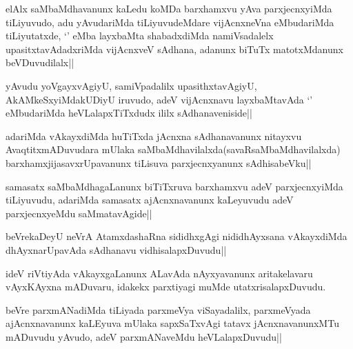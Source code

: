 
\begin{artha}
elAlx saMbaMdhavanunx kaLedu koMDa barxhamxvu yAva parxjecnxyiMda tiLiyuvudo, adu yAvudariMda tiLiyuvudeMdare vijAcnxneVna eMbudariMda tiLiyutatxde, `\stext' eMba layxbaMta shabadxdiMda namiVsadalelx upasitxtavAdadxriMda vijAcnxveV sAdhana, adanunx biTuTx matotxMdanunx beVDuvudilalx||
\end{artha}

\begin{artha}
yAvudu yoVgayxvAgiyU, samiVpadalilx upasithxtavAgiyU, AkAMkeSxyiMdakUDiyU iruvudo, adeV vijAcnxnavu layxbaMtavAda `\stext' eMbudariMda heVLalapxTiTxdudx ililx sAdhanaveniside||
\end{artha}

\begin{artha}
adariMda vAkayxdiMda huTiTxda jAcnxna sAdhanavanunx nitayxvu AvaqtitxmADuvudara mUlaka saMbaMdhavilalxda(savaRsaMbaMdhavilalxda) barxhamxjijasavxrUpavanunx tiLisuva parxjecnxyanunx sAdhisabeVku||
\end{artha}

\begin{artha}
samasatx saMbaMdhagaLanunx biTiTxruva barxhamxvu adeV parxjecnxyiMda tiLiyuvudu, adariMda samasatx ajAcnxnavanunx kaLeyuvudu adeV parxjecnxyeMdu saMmatavAgide||
\end{artha}


\begin{artha}
beVrekaDeyU neVrA AtamxdashaRna sididhxgAgi nididhAyxsana vAkayxdiMda dhAyxnarUpavAda sAdhanavu vidhisalapxDuvudu||
\end{artha}

\begin{artha}
ideV riVtiyAda vAkayxgaLanunx ALavAda nAyxyavanunx aritakelavaru vAyxKAyxna mADuvaru, idakekx parxtiyagi muMde utatxrisalapxDuvudu.
\end{artha}


\begin{artha}
beVre parxmANadiMda tiLiyada parxmeVya viSayadalilx, parxmeVyada ajAcnxnavanunx kaLEyuva mUlaka sapxSaTxvAgi tatavx jAcnxnavanunxMTu mADuvudu yAvudo, adeV parxmANaveMdu heVLalapxDuvudu||
\end{artha}


